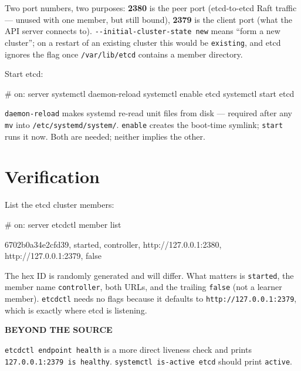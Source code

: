 \documentclass[11pt,oneside]{report}
\newcommand{\calloutlabel}[2]{{\sffamily\bfseries\footnotesize\color{#1}#2\quad}}
\begin{document}
Two port numbers,
two purposes:
\textbf{2380} is the
peer port
(etcd-to-etcd Raft
traffic --- unused
with one member, but
still bound),
\textbf{2379} is the
client port (what
the API server
connects to).
\texttt{-\/-initial-}\allowbreak{}\texttt{cluster-}\allowbreak{}\texttt{state\ new}
means ``form a new
cluster''; on a
restart of an
existing cluster
this would be
\texttt{existing},
and etcd ignores the
flag once
\texttt{/var/lib/etcd}
contains a member
directory.

Start etcd:

\begin{cmdlst}
# on: server
{
  systemctl daemon-reload
  systemctl enable etcd
  systemctl start etcd
}
\end{cmdlst}

\texttt{daemon-reload}
makes systemd
re-read unit files
from disk ---
required after any
\texttt{mv} into
\texttt{/}\allowbreak{}\texttt{etc/}\allowbreak{}\texttt{systemd/}\allowbreak{}\texttt{system/}\allowbreak{}.
\texttt{enable}
creates the
boot-time symlink;
\texttt{start} runs
it now. Both are
needed; neither
implies the other.

\hypertarget{verification-6}{%
\section{Verification}\label{verification-6}}

List the etcd
cluster members:

\begin{cmdlst}
# on: server
etcdctl member list
\end{cmdlst}

\begin{outlst}
6702b0a34e2cfd39, started, controller, http://127.0.0.1:2380, http://127.0.0.1:2379, false
\end{outlst}

The hex ID is
randomly generated
and will differ.
What matters is
\texttt{started},
the member name
\texttt{controller},
both URLs, and the
trailing
\texttt{false} (not
a learner member).
\texttt{etcdctl}
needs no flags
because it defaults
to
\texttt{http:}\allowbreak{}\texttt{/}\allowbreak{}\texttt{/}\allowbreak{}\texttt{127.}\allowbreak{}\texttt{0.}\allowbreak{}\texttt{0.}\allowbreak{}\texttt{1:}\allowbreak{}\texttt{2379},
which is exactly
where etcd is
listening.

\begin{beyondbox}\calloutlabel{teal}{BEYOND THE SOURCE}

\texttt{etcdctl\ endpoint\ health}
is a more direct
liveness check and
prints
\texttt{127.}\allowbreak{}\texttt{0.}\allowbreak{}\texttt{0.}\allowbreak{}\texttt{1:}\allowbreak{}\texttt{2379\ is\ healthy}.
\texttt{systemctl\ is-}\allowbreak{}\texttt{active\ etcd}
should print
\texttt{active}.

\end{beyondbox}
\end{document}
